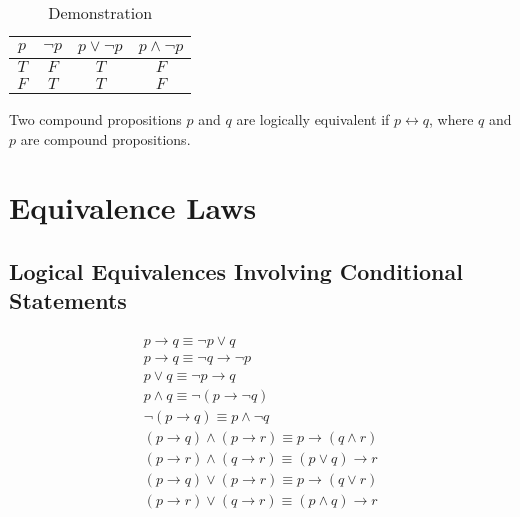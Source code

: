 \documentclass[12pt letter]{report}
\begin{document}



\begin{table}[h!]
  \caption{Demonstration}\label{tab:}
  \begin{center}
    \begin{tabular}{|c c|c|c|}
      \hline
      $p$ & $\neg p$ & $p \vee \neg p$ & $p \wedge \neg p$ \\ [0.5ex]
      \hline
      \hline
      $T$ & $F$      & $T$             & $F$               \\
      $F$ & $T$      & $T$             & $F$               \\
      \hline
    \end{tabular}
  \end{center}
\end{table}

Two compound propositions $p$ and $q$ are logically equivalent if $p \leftrightarrow q$, where $q$ and $p$ are compound propositions.

\section{Equivalence Laws}

\subsection{Logical Equivalences Involving Conditional Statements}

\begin{align*}
  p \to q \equiv \neg p \vee q                                                                  \\
  p \to q \equiv \neg q \to \neg p                                                              \\
  p \vee q \equiv \neg p \to q                                                                  \\
  p \wedge q \equiv \neg \left( p \to \neg q  \right)                                           \\
  \neg  \left( p \to q \right) \equiv p \wedge \neg q                                           \\
  \left( p \to q  \right)  \wedge \left( p \to r \right) \equiv p \to \left( q \wedge r \right) \\
  \left( p \to r \right)  \wedge \left( q \to r \right)  \equiv \left( p \vee q \right) \to r   \\
  \left( p \to q  \right) \vee \left( p \to r \right) \equiv p \to \left( q \vee r \right)      \\
  \left( p \to r \right) \vee \left( q \to r \right) \equiv \left( p \wedge q \right) \to r     \\
\end{align*}
\end{document}
